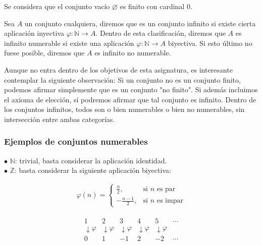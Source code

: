 \documentclass[12pt,a4paper]{article}
\newcommand{\N}{\mathbb{N}}
\newcommand{\Z}{\mathbb{Z}}
\newcounter{unit}[section]
\newcounter{chapter}[unit]
\renewcommand{\theunit}{\arabic{unit}}
\renewcommand{\thechapter}{\arabic{chapter}}
\renewcommand{\thesubsubsection}{\theunit.\thechapter.\arabic{subsubsection}}
\newcommand{\result}[1]{%
  \subsubsection{#1}%
  \label{result:\thesubsubsection}
}
\begin{document}
\noindent Se considera que el conjunto vacío $\varnothing$ es finito con cardinal $0$.

\vspace{4mm}

Sea $A$ un conjunto cualquiera, diremos que es un conjunto infinito si existe cierta aplicación inyectiva $\varphi : \N \to A$. Dentro de esta clasificación, diremos que $A$ es infinito numerable si existe una aplicación $\varphi : \N \to A$ biyectiva. Si esto último no fuese posible, diremos que $A$ es infinito no numerable.

\vspace{4mm}

Aunque no entra dentro de los objetivos de esta asignatura, es interesante contemplar la siguiente observación: Si un conjunto no es un conjunto finito, podemos afirmar simplemente que es un conjunto "no finito". Si además incluimos el axioma de elección, sí podremos afirmar que tal conjunto es infinito. Dentro de los conjuntos infinitos, todos son o bien numerables o bien no numerables, sin intersección entre ambas categorías.

\vspace{4mm}

\result{Ejemplos de conjuntos numerables}

$\bullet$ $\N$: trivial, basta considerar la aplicación identidad. \\

\noindent
$\bullet$ $\Z$: basta considerar la siguiente aplicación biyectiva:

\begin{minipage}{0.5\textwidth}
    \begin{align*}
    \varphi(n) =
    \begin{cases}
    \frac{n}{2}, & \text{si } n \text{ es par} \\
    -\frac{n-1}{2}, & \text{si } n \text{ es impar}
    \end{cases}
    \end{align*}
\end{minipage}%
\begin{minipage}{0.5\textwidth}
    \begin{align*}
    \begin{array}{cccccc}
    1 & 2 & 3 & 4 & 5 & \cdots \\
    \downarrow\!\varphi & \downarrow\!\varphi & \downarrow\!\varphi & \downarrow\!\varphi & \downarrow\!\varphi & \\
    0 & 1 & -1 & 2 & -2 & \cdots
    \end{array}
    \end{align*}
\end{minipage}
\end{document}
